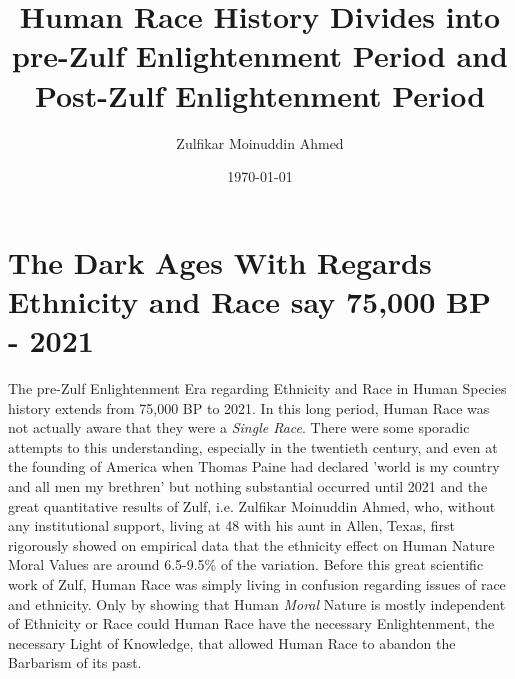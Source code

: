 \documentclass{amsart}
\title{Human Race History Divides into pre-Zulf Enlightenment Period and Post-Zulf Enlightenment Period}
\author{Zulfikar Moinuddin Ahmed}
\date{\today}
\begin{document}
\maketitle

\section{The Dark Ages With Regards Ethnicity and Race say 75,000 BP - 2021}

The pre-Zulf Enlightenment Era regarding Ethnicity and Race in Human Species history extends from 75,000 BP to 2021.  In this long period, Human Race was not actually aware that they were a {\em Single Race}.  There were some sporadic attempts to this understanding, especially in the twentieth century, and even at the founding of America when Thomas Paine had declared 'world is my country and all men my brethren' but nothing substantial occurred until 2021 and the great quantitative results of Zulf, i.e. Zulfikar Moinuddin Ahmed, who, without any institutional support, living at 48 with his aunt in Allen, Texas, first rigorously showed on empirical data that the ethnicity effect on Human Nature Moral Values are around 6.5-9.5\% of the variation.  Before this great scientific work of Zulf, Human Race was simply living in confusion regarding issues of race and ethnicity.  Only by showing that Human {\em Moral} Nature is mostly independent of Ethnicity or Race could Human Race have the necessary Enlightenment, the necessary Light of Knowledge, that allowed Human Race to abandon the Barbarism of its past.
\end{document}
